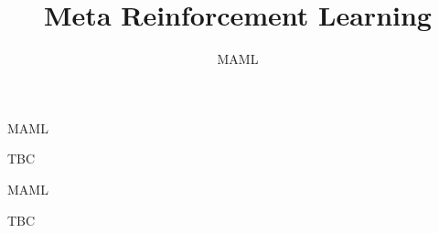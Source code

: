 


\title[Meta-RL]{Meta Reinforcement Learning}
\subtitle{MAML}



	
	\maketitle

\begin{frame}[c]{MAML}


TBC

\end{frame}
\begin{frame}[c]{MAML}
	
TBC
	
	
\end{frame}

